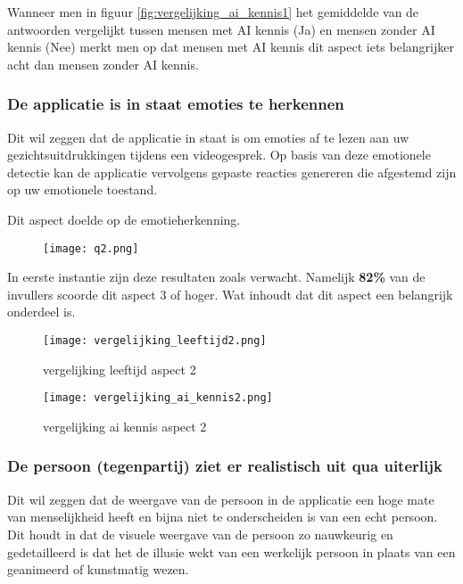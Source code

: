 Wanneer men in figuur \ref{fig:vergelijking_ai_kennis1} het gemiddelde van de antwoorden vergelijkt tussen mensen met AI kennis (Ja) en mensen zonder AI kennis (Nee) merkt men op dat mensen met AI kennis dit aspect iets belangrijker acht dan mensen zonder AI kennis.

\newpage

\subsubsection{De applicatie is in staat emoties te herkennen}

Dit wil zeggen  dat de applicatie in staat is om emoties af te lezen aan uw gezichtsuitdrukkingen tijdens een videogesprek. Op basis van deze emotionele detectie kan de applicatie vervolgens gepaste reacties genereren die afgestemd zijn op uw emotionele toestand.

Dit aspect doelde op de emotieherkenning.

\begin{figure}[htbp]
    \centering
    \texttt{[image: q2.png]}
    \label{fig:vraag_2_resultaat}
\end{figure}

In eerste instantie zijn deze resultaten zoals verwacht. Namelijk \textbf{82\%} van de invullers scoorde dit aspect 3 of hoger. Wat inhoudt dat dit aspect een belangrijk onderdeel is.

\begin{figure}[htbp]
    \centering
    \texttt{[image: vergelijking\_leeftijd2.png]}
    \caption{vergelijking leeftijd aspect 2}
    \label{fig:vergelijking_leeftijd2}
\end{figure}

\begin{figure}[htbp]
    \centering
    \texttt{[image: vergelijking\_ai\_kennis2.png]}
    \caption{vergelijking ai kennis aspect 2}
    \label{fig:vergelijking_ai_kennis2}
\end{figure}

\newpage

\subsubsection{De persoon (tegenpartij) ziet er realistisch uit qua uiterlijk}

Dit wil zeggen dat de weergave van de persoon in de applicatie een hoge mate van menselijkheid heeft en bijna niet te onderscheiden is van een echt persoon. Dit houdt in dat de visuele weergave van de persoon zo nauwkeurig en gedetailleerd is dat het de illusie wekt van een werkelijk persoon in plaats van een geanimeerd of kunstmatig wezen.

